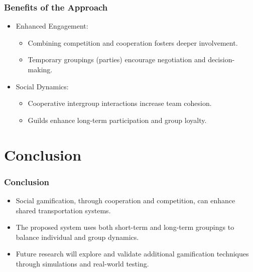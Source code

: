 \begin{frame}
    \frametitle{Benefits of the Approach}
    \begin{itemize}
        \item Enhanced Engagement:
        \begin{itemize}
            \item Combining competition and cooperation fosters deeper involvement.
            \item Temporary groupings (parties) encourage negotiation and decision-making.
        \end{itemize}
        \item Social Dynamics:
        \begin{itemize}
            \item Cooperative intergroup interactions increase team cohesion.
            \item Guilds enhance long-term participation and group loyalty.
        \end{itemize}
    \end{itemize}
\end{frame}

\section{Conclusion}
\begin{frame}
    \frametitle{Conclusion}
    \begin{itemize}
        \item Social gamification, through cooperation and competition, can enhance shared transportation systems.
        \item The proposed system uses both short-term and long-term groupings to balance individual and group dynamics.
        \item Future research will explore and validate additional gamification techniques through simulations and real-world testing.
    \end{itemize}
\end{frame}
